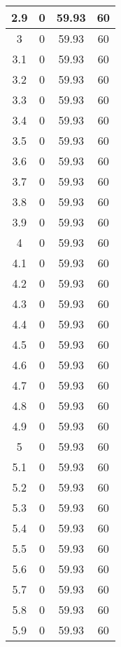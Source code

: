 \begin{longtable}[c]{|c|c|c|c|}
2.9 &	0    &	59.93 &	60 \\ \hline 
3   &	0    &	59.93 &	60 \\ \hline 
3.1 &	0    &	59.93 &	60 \\ \hline 
3.2 &	0    &	59.93 &	60 \\ \hline 
3.3 &	0    &	59.93 &	60 \\ \hline 
3.4 &	0    &	59.93 &	60 \\ \hline 
3.5 &	0    &	59.93 &	60 \\ \hline 
3.6 &	0    &	59.93 &	60 \\ \hline 
3.7 &	0    &	59.93 &	60 \\ \hline 
3.8 &	0    &	59.93 &	60 \\ \hline 
3.9 &	0    &	59.93 &	60 \\ \hline 
4   &	0    &	59.93 &	60 \\ \hline 
4.1 &	0    &	59.93 &	60 \\ \hline 
4.2 &	0    &	59.93 &	60 \\ \hline 
4.3 &	0    &	59.93 &	60 \\ \hline 
4.4 &	0    &	59.93 &	60 \\ \hline 
4.5 &	0    &	59.93 &	60 \\ \hline 
4.6 &	0    &	59.93 &	60 \\ \hline 
4.7 &	0    &	59.93 &	60 \\ \hline 
4.8 &	0    &	59.93 &	60 \\ \hline 
4.9 &	0    &	59.93 &	60 \\ \hline 
5   &	0    &	59.93 &	60 \\ \hline 
5.1 &	0    &	59.93 &	60 \\ \hline 
5.2 &	0    &	59.93 &	60 \\ \hline 
5.3 &	0    &	59.93 &	60 \\ \hline 
5.4 &	0    &	59.93 &	60 \\ \hline 
5.5 &	0    &	59.93 &	60 \\ \hline 
5.6 &	0    &	59.93 &	60 \\ \hline 
5.7 &	0    &	59.93 &	60 \\ \hline 
5.8 &	0    &	59.93 &	60 \\ \hline 
5.9 &	0    &	59.93 &	60 \\ \hline 
\end{longtable}


